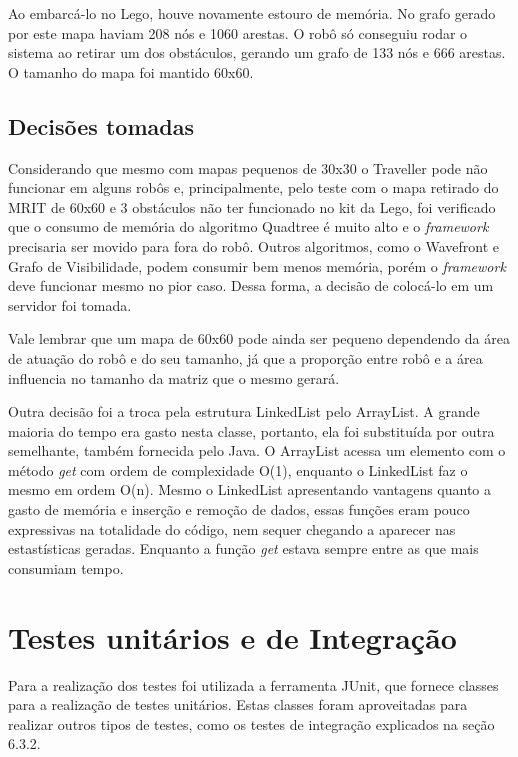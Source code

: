 Ao embarcá-lo no Lego, houve novamente estouro de memória. No grafo gerado por este mapa haviam 208 nós e 1060 arestas. O robô só conseguiu rodar o sistema ao retirar um dos obstáculos, gerando um grafo de 133 nós e 666 arestas. O tamanho do mapa foi mantido 60x60.

\subsection{Decisões tomadas}

Considerando que mesmo com mapas pequenos de 30x30 o Traveller pode não funcionar em alguns robôs e, principalmente, pelo teste com o mapa retirado do MRIT de 60x60 e 3 obstáculos não ter funcionado no kit da Lego, foi verificado que o consumo de memória do algoritmo Quadtree é muito alto e o \textit{framework} precisaria ser movido para fora do robô. Outros algoritmos, como o Wavefront e Grafo de Visibilidade, podem consumir bem menos memória, porém o \textit{framework} deve funcionar mesmo no pior caso. Dessa forma, a decisão de colocá-lo em um servidor foi tomada.

Vale lembrar que um mapa de 60x60 pode ainda ser pequeno dependendo da área de atuação do robô e do seu tamanho, já que a proporção entre robô e a área influencia no tamanho da matriz que o mesmo gerará.

Outra decisão foi a troca pela estrutura LinkedList pelo ArrayList. A grande maioria do tempo era gasto nesta classe, portanto, ela foi substituída por outra semelhante, também fornecida pelo Java. O ArrayList acessa um elemento com o método \textit{get} com ordem de complexidade O(1), enquanto o LinkedList faz o mesmo em ordem O(n). Mesmo o LinkedList apresentando vantagens quanto a gasto de memória e inserção e remoção de dados, essas funções eram pouco expressivas na totalidade do código, nem sequer chegando a aparecer nas estastísticas geradas. Enquanto a função \textit{get} estava sempre entre as que mais consumiam tempo.

\section{Testes unitários e de Integração}

Para a realização dos testes foi utilizada a ferramenta JUnit, que fornece classes para a realização de testes unitários. Estas classes foram aproveitadas para realizar outros tipos de testes, como os testes de integração explicados na seção 6.3.2.

